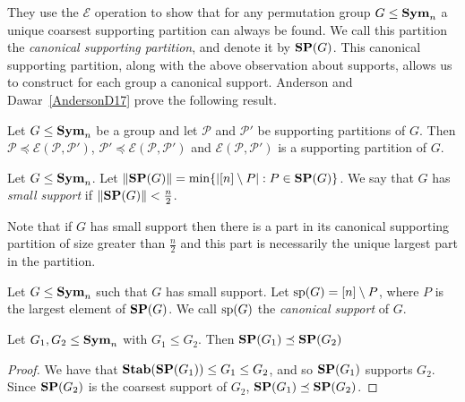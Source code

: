 \documentclass[../paper.tex]{subfiles}
\begin{document}
They use the $\mathcal{E}$ operation to show that for any permutation group $G
\leq \text{\textbf{Sym}}_n$ a unique coarsest supporting partition can always be found. We call
this partition the \emph{canonical supporting partition}, and denote it by $\text{\textbf{SP}}
(G)$. This canonical supporting partition, along with the above observation
about supports, allows us to construct for each group a canonical support.
Anderson and Dawar~\ref{AndersonD17} prove the following result.

\begin{prop}
  \label{prop:combining-supporting-patitions}
  Let $G \leq \text{\textbf{Sym}}_n$ be a group and let $\mathcal{P}$ and $\mathcal{P}'$ be
  supporting partitions of $G$. Then $\mathcal{P} \preceq
  \mathcal{E}(\mathcal{P}, \mathcal{P}')$, $ \mathcal{P}' \preceq
  \mathcal{E}(\mathcal{P}, \mathcal{P}')$ and $\mathcal{E}(\mathcal{P},
  \mathcal{P}')$ is a supporting partition of $G$.
\end{prop}

\begin{definition}
  Let $G \leq \text{\textbf{Sym}}_n$. Let $\| \text{\textbf{SP}}(G) \| = \min \{\vert [n] \setminus P \vert :
  P \in \text{\textbf{SP}}(G) \}$. We say that $G$ has \emph{small support} if $\| \text{\textbf{SP}}(G) \| <
  \frac{n}{2}$.
\end{definition}

Note that if $G$ has small support then there is a part in its canonical
supporting partition of size greater than $\frac{n}{2}$ and this part is
necessarily the unique largest part in the partition.

\begin{definition}
  Let $G \leq \text{\textbf{Sym}}_n$ such that $G$ has small support. Let $\text{sp}(G) = [n]
  \setminus P$, where $P$ is the largest element of $\text{\textbf{SP}}(G)$. We call
  $\text{sp}(G)$ the \emph{canonical support} of $G$.
\end{definition}


\begin{lem}\label{lem:subgroup-coarse}
  Let $G_1, G_2 \leq \text{\textbf{Sym}}_n$ with $G_1 \leq G_2$. Then $\text{\textbf{SP}}(G_1) \preceq
  \text{\textbf{SP}}(G_2)$
\end{lem}
\begin{proof}
  We have that $\text{\textbf{Stab}}(\text{\textbf{SP}}(G_1)) \leq G_1 \leq G_2$, and so $\text{\textbf{SP}}(G_1)$ supports
  $G_2$. Since $\text{\textbf{SP}}(G_2)$ is the coarsest support of $G_2$, $\text{\textbf{SP}}(G_1) \preceq
  \text{\textbf{SP}}(G_2)$.
\end{proof}
\end{document}

